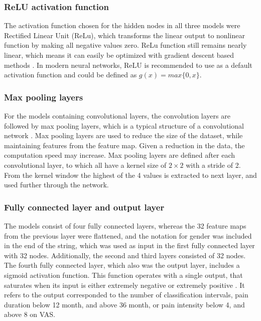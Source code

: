 \subsubsection*{\textbf{ReLU activation function}}
The activation function chosen for the hidden nodes in all three models were Rectified Linear Unit (ReLu), which transforms the linear output to nonlinear function by making all negative values zero. ReLu function still remains nearly linear, which means it can easily be optimized with gradient descent based methods \citep{Goodfellow2016}. In modern neural networks, ReLU is recommended to use as a default activation function and could be defined as $g(x) = max\{0, x\}$. 

\subsubsection*{\textbf{Max pooling layers}}
For the models containing convolutional layers, the convolution layers are followed by max pooling layers, which is a typical structure of a convolutional network \citep{Goodfellow2016, LeCun2015}.
Max pooling layers are used to reduce the size of the dataset, while maintaining features from the feature map. Given a reduction in the data, the computation speed may increase.\citep{Goodfellow2016,LeCun1998} 
Max pooling layers are defined after each convolutional layer, to which all have a kernel size of $2 \times 2$ with a stride of 2. From the kernel window the highest of the 4 values is extracted to next layer, and used further through the network. 

\subsubsection*{\textbf{Fully connected layer and output layer}}
The models consist of four fully connected layers, whereas the 32 feature maps from the previous layer were flattened, and the notation for gender was included in the end of the string, which was used as input in the first fully connected layer with 32 nodes. Additionally, the second and third layers consisted of 32 nodes. The fourth fully connected layer, which also was the output layer, includes a sigmoid activation function. 
This function operates with a single output, that saturates when its input is either extremely negative or extremely positive \citep{Goodfellow2016}. It refers to the output corresponded to the number of classification intervals, pain duration below 12 month, and above 36 month, or pain intensity below 4, and above 8 on VAS. 


